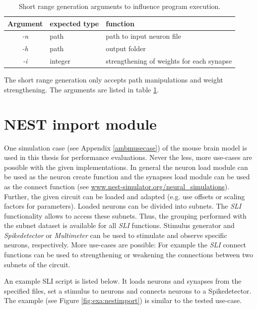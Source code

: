 \begin{table}[ht!]
\begin{centering}
    \begin{tabular}{ | c | l | p{7cm} |}
    \hline
    Argument & expected type & function \\ \hline \hline
    \emph{-n} & path & path to input neuron file \\ \hline
    \emph{-h} & path &  output folder\\ \hline
    \emph{-i} & integer & strengthening of weights for each synapse \\ \hline
    \end{tabular}
    \caption{Short range generation arguments to influence program execution.}
    \label{tab:shortrangeargs}
\end{centering}
\end{table}

The short range generation only accepts path manipulations and weight strengthening.
The arguments are listed in table \ref{tab:shortrangeargs}.

\section{NEST import module}

One simulation case (see Appendix \ref{ambmusecase}) of the mouse brain model is used in this thesis for performance evaluations.
Never the less, more use-cases are possible with the given implementations.
In general the neuron load module can be used as the neuron create function
and the synapses load module can be used as the connect function (see \url{www.nest-simulator.org/neural_simulations}).
Further, the given circuit can be loaded and adapted (e.g. use offsets or scaling factors for parameters).
Loaded neurons can be divided into subnets. 
The \emph{SLI} functionality allows to access these subnets.
Thus, the grouping performed with the subnet dataset is available for all \emph{SLI} functions.
Stimulus generator and \emph{Spikedetector} or \emph{Multimeter} can be used to stimulate
and observe specific neurons, respectively.
More use-cases are possible: For example the \emph{SLI} connect functions can be used to strengthening or weakening the connections between two
subnets of the circuit.

An example SLI script is listed below.
It loads neurons and synapses from the specified files,
set a stimulus to neurons and connects neurons to a Spikedetector.
The example (see Figure \ref{fig:exa:nestimport}) is similar to the tested use-case.

